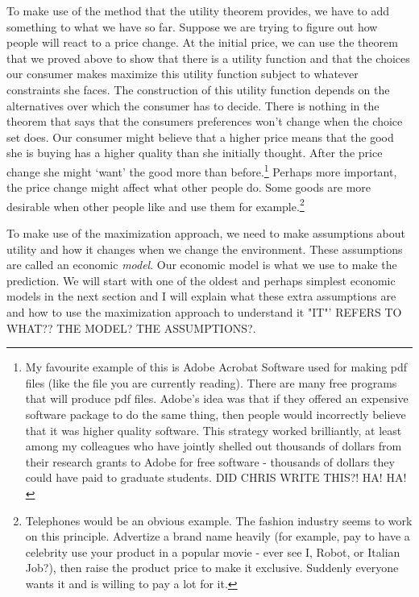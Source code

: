 \documentclass[12pt]{article}
\newcommand{\tmem}[1]{\textit{#1}}
\begin{document}
To make use of the method that the utility theorem provides, we have to add
something to what we have so far. Suppose we are trying to figure out how
people will react to a price change. At the initial price, we can use the
theorem that we proved above to show that there is a utility function and that
the choices our consumer makes maximize this utility function subject to
whatever constraints she faces. The construction of this utility function
depends on the alternatives over which the consumer has to decide. There is
nothing in the theorem that says that the consumers preferences won't change
when the choice set does. Our consumer might believe that a higher price means
that the good she is buying has a higher quality than she initially thought.
After the price change she might `want' the good more than
before.{\footnote{My favourite example of this is Adobe Acrobat Software used
for making pdf files (like the file you are currently reading). There are many
free programs that will produce pdf files. Adobe's idea was that if they
offered an expensive software package to do the same thing, then people would
incorrectly believe that it was higher quality software. This strategy worked
brilliantly, at least among my colleagues who have jointly shelled out
thousands of dollars from their research grants to Adobe for free software -
thousands of dollars they could have paid to graduate students. DID CHRIS WRITE THIS?! HA! HA!}} Perhaps more
important, the price change might affect what other people do. Some goods are
more desirable when other people like and use them for
example.{\footnote{Telephones would be an obvious example. The fashion
industry seems to work on this principle. Advertize a brand name heavily (for
example, pay to have a celebrity use your product in a popular movie - ever
see I, Robot, or Italian Job?), then raise the product price to make it
exclusive. Suddenly everyone wants it and is willing to pay a lot for it. }}

To make use of the maximization approach, we need to make assumptions about
utility and how it changes when we change the environment. These assumptions
are called an economic {\tmem{model}}. Our economic model is what we use to
make the prediction. We will start with one of the oldest and perhaps simplest
economic models in the next section and I will explain what these extra
assumptions are and how to use the maximization approach to understand it "IT"' REFERS TO WHAT?? THE MODEL? THE ASSUMPTIONS?.
\end{document}
